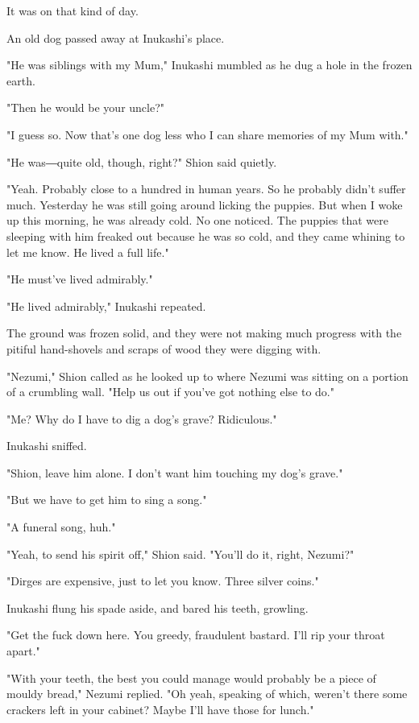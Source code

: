It was on that kind of day.

An old dog passed away at Inukashi's place.

"He was siblings with my Mum," Inukashi mumbled as he dug a hole in the
frozen earth.

"Then he would be your uncle?"

"I guess so. Now that's one dog less who I can share memories of my Mum
with."

"He was―quite old, though, right?" Shion said quietly.

"Yeah. Probably close to a hundred in human years. So he probably didn't
suffer much. Yesterday he was still going around licking the puppies.
But when I woke up this morning, he was already cold. No one noticed.
The puppies that were sleeping with him freaked out because he was so
cold, and they came whining to let me know. He lived a full life."

"He must've lived admirably."

"He lived admirably," Inukashi repeated.

The ground was frozen solid, and they were not making much progress with
the pitiful hand-shovels and scraps of wood they were digging with.

"Nezumi," Shion called as he looked up to where Nezumi was sitting on a
portion of a crumbling wall. "Help us out if you've got nothing else to
do."

"Me? Why do I have to dig a dog's grave? Ridiculous."

Inukashi sniffed.

"Shion, leave him alone. I don't want him touching my dog's grave."

"But we have to get him to sing a song."

"A funeral song, huh."

"Yeah, to send his spirit off," Shion said. "You'll do it, right,
Nezumi?"

"Dirges are expensive, just to let you know. Three silver coins."

Inukashi flung his spade aside, and bared his teeth, growling.

"Get the fuck down here. You greedy, fraudulent bastard. I'll rip your
throat apart."

"With your teeth, the best you could manage would probably be a piece of
mouldy bread," Nezumi replied. "Oh yeah, speaking of which, weren't
there some crackers left in your cabinet? Maybe I'll have those for
lunch."

